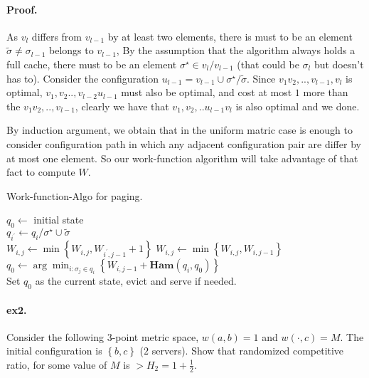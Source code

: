 \documentclass{article}
\begin{document}
\begin{multicols*}{2}
  \paragraph{Proof.} As $v_{l}$ differs from $v_{l-1}$ by at least two elements, there is must to be an element $\tilde{\sigma} \neq \sigma_{l-1}$ belongs to $v_{l-1}$, By the assumption that the algorithm always holds a full cache, there must to be an element $\sigma^{\star} \in v_{l} / v_{l-1}$ (that could be $\sigma_{l}$ but doesn't has to). Consider the configuration $u_{l-1} = v_{l-1} \cup \sigma^{\star} / \tilde{\sigma}$. Since $v_{1}v_{2},..,v_{l-1},v_{l}$ is optimal, $v_{1},v_{2}..,v_{l-2}u_{l-1}$ must also be optimal, and cost at most $1$ more than the  $v_{1}v_{2},..,v_{l-1} $, clearly we have that $v_{1},v_{2},..u_{l-1}v_{l}$ is also optimal and we done. 

  By induction argument, we obtain that in the uniform matric case is enough to consider configuration path in which any adjacent configuration pair are differ by at most one element. So our work-function algorithm will take advantage of that fact to compute $W$.

  \begin{algorithm}[H]
    \caption{Work-function-Algo for paging.}
    \label{alg:three}
    $q_{0} \leftarrow $ initial state \\ 
     {
       {
	 {
	   {
	    $q_{i^{\prime} } \leftarrow  q_{i} / \sigma^{\star} \cup \tilde{\sigma}$ \\ 
	    $W_{i,j} \leftarrow \min \left\{   W_{i,j} ,  W_{i^{\prime},j-1} + 1 \right\} $
	  }
	  $W_{i,j} \leftarrow \min \left\{   W_{i,j} ,  W_{i,j-1}  \right\} $ \\
	}
      }
      $q_{0} \leftarrow \arg \min_{i : \sigma_{j} \in q_{i}} \left\{ W_{i,j-1} +  \mathbf{Ham}\left( q_{i}, q_{0} \right)  \right\} $ \\
      Set $q_{0}$ as the current state, evict and serve if needed. 
    }
  \end{algorithm}
  \paragraph{ex2.} Consider the following $3$-point metric space, $w\left( a,b \right) = 1 $ and $w\left( \cdot, c  \right) = M $. The initial configuration is $ \left\{ b,c \right\}$ ($2$ servers). Show that randomized competitive ratio, for some value of $M$ is $ > H_{2} = 1 + \frac{1}{2}$. 

\end{multicols*}
\end{document}

